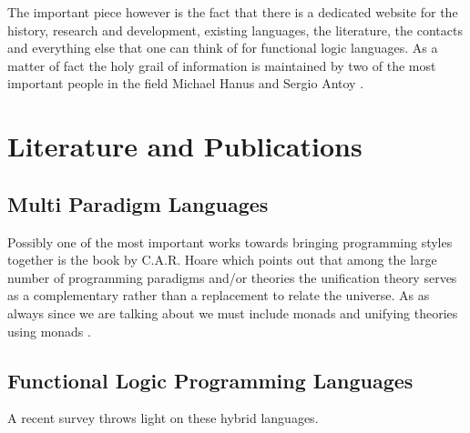 \documentclass[thesis-solanki.tex]{subfiles}
\begin{document}
The important piece however is the fact that there is a dedicated website \cite{website:funclogprog} for the history,
research and development, existing languages, the literature, the contacts and everything else that one can think
of for functional logic languages.
As a matter of fact the holy grail of information is maintained by two of the most important people in the field
Michael Hanus \cite{website:mhanus} and Sergio Antoy \cite{website:santoy}.




\section{Literature and Publications}
\subsection{Multi Paradigm Languages}
Possibly one of the most important works towards bringing programming styles together is the book by C.A.R.
Hoare \cite{hoare1998unifying} which points out that among the large number of programming paradigms and/or
theories the unification theory serves as a complementary rather than a replacement to relate the universe.
As as always since we are talking about  we must include monads and unifying theories using
  monads \cite{gibbons2013unifying}.
 

\subsection{Functional Logic Programming Languages}

A recent survey \cite{hanus2007multi} throws light on these hybrid languages. 
\end{document}
